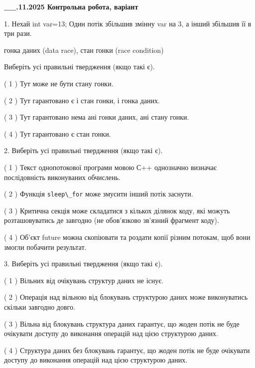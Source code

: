 \documentclass[12pt, ukrainian]{article}
\def\code#1{\Verb!#1!}
\begin{document}
\newpage
\begin {large}

\textbf{\_\_.11.2025 Контрольна робота, варіант  }\par


{
1. Нехай int var=13; Один потік збільшив змінну var на 3, а інший збільшив її в три рази.

гонка даних (data race), стан гонки (race condition)

Виберіть усі правильні твердження (якщо такі є).\par
\vspace{2mm}
( 1 ) Тут може не бути стану гонки.%

( 2 ) Тут гарантовано є і стан гонки, і гонка даних.%

( 3 ) Тут гарантовано нема ані гонки даних, ані стану гонки.%

( 4 ) Тут гарантовано є стан гонки.%


2. Виберіть усі правильні твердження (якщо такі є).\par
\vspace{2mm}

( 1 ) Текст однопотокової програми мовою С++ однозначно визначає послідовність виконуваних обчислень.%

( 2 ) Функція \code{sleep\_for} може змусити інший потік заснути.%

( 3 ) Критична секція може складатися з кількох ділянок коду, які можуть розташовуватись де завгодно (не обов’язково зв’язний фрагмент коду).%

( 4 ) Об’єкт future можна скопіювати та роздати копії різним потокам, щоб вони змогли побачити результат.%


3. Виберіть усі правильні твердження (якщо такі є).\par
\vspace{2mm}

( 1 ) Вільних від очікувань структур даних не існує.%

( 2 ) Операція над вільною від блокувань структурою даних може виконуватись скільки завгодно довго.%

( 3 ) Вільна від блокувань структура даних гарантує, що жоден потік не буде очікувати доступу до виконання операцій над цією структурою даних.%

( 4 ) Структура даних без блокувань гарантує, що жоден потік не буде очікувати доступу до виконання операцій над цією структурою даних.%


}
\end{large}
\end{document}
